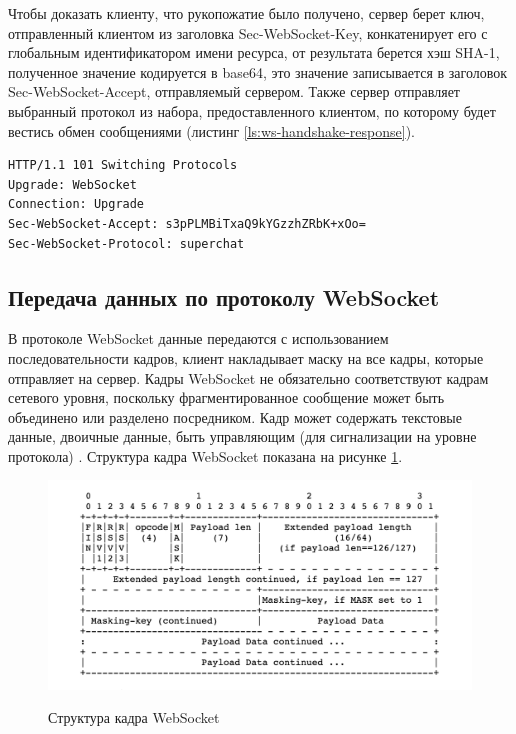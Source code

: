 Чтобы доказать клиенту, что рукопожатие было получено, сервер берет ключ, отправленный клиентом из заголовка Sec-WebSocket-Key, конкатенирует его с глобальным идентификатором имени ресурса, от результата берется хэш SHA-1, полученное значение кодируется в base64, это значение записывается в заголовок Sec-WebSocket-Accept, отправляемый сервером. Также сервер отправляет выбранный протокол из набора, предоставленного клиентом, по которому будет вестись обмен сообщениями (листинг \ref{ls:ws-handshake-response}).

\begin{lstlisting}[caption={HTTP ответ на открытие WebSocket соединение}, label={ls:ws-handshake-response}]
HTTP/1.1 101 Switching Protocols
Upgrade: WebSocket
Connection: Upgrade
Sec-WebSocket-Accept: s3pPLMBiTxaQ9kYGzzhZRbK+xOo=
Sec-WebSocket-Protocol: superchat
\end{lstlisting}

\subsection{Передача данных по протоколу WebSocket}

В протоколе WebSocket данные передаются с использованием последовательности кадров, клиент накладывает маску на все кадры, которые отправляет на сервер. Кадры WebSocket не обязательно соответствуют кадрам сетевого уровня, поскольку фрагментированное сообщение может быть объединено или разделено посредником. Кадр может содержать текстовые данные, двоичные данные, быть управляющим (для сигнализации на уровне протокола) \cite{rfc6455}. Структура кадра WebSocket показана на рисунке \ref{fig:ws-frame-format}.

\begin{figure}[H]
\begin{center}
\includegraphics[width=1.0\hsize]{fig/ws-frame-format.png}\\[2mm]
\caption{Структура кадра WebSocket}\label{fig:ws-frame-format}
\end{center}
\end{figure}

